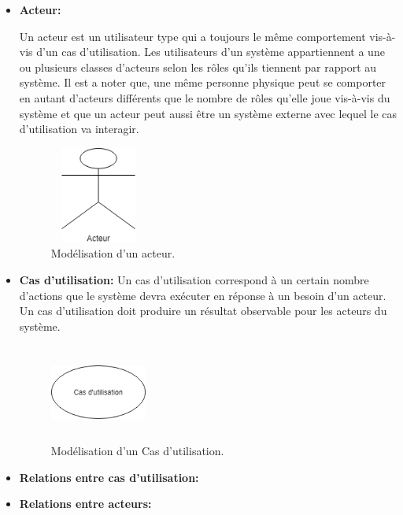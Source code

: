 \begin{itemize}
    
    \item \textbf{Acteur:}
    
    Un acteur est un utilisateur type qui a toujours le même comportement vis-à-vis d’un cas d’utilisation. Les utilisateurs d'un système appartiennent a une ou plusieurs classes d’acteurs selon les rôles qu’ils tiennent par rapport au système. Il est a noter que, une même personne physique peut se comporter en autant d’acteurs différents que le nombre de rôles qu’elle joue vis-à-vis du système et que un acteur peut aussi être un système externe avec lequel le cas d’utilisation va interagir.\cite{uml}
    
    \begin{figure}[H]
        \centering
        \includegraphics[height=90pt,width=90pt]{img/chapter3/ActeurUML.png}
        \caption{Modélisation d'un acteur.}
    \end{figure}
    
    
    \item \textbf{Cas d'utilisation:}
    Un cas d’utilisation correspond à un certain nombre d’actions que le système devra exécuter en réponse à un besoin d’un acteur. Un cas d’utilisation doit produire un résultat observable pour les acteurs du système.
    
\begin{figure}[H]
    \centering
    \includegraphics[height=90pt,width=90pt]{img/chapter3/CasutilisationUML.png}
    \caption{Modélisation d'un Cas d'utilisation.}
\end{figure}


    \item \textbf{Relations entre cas d'utilisation:}

    \item \textbf{Relations entre acteurs:}
    
    
\end{itemize}


